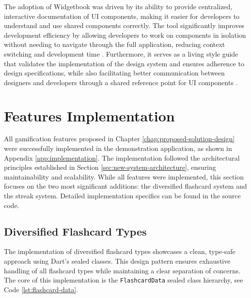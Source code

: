 The adoption of Widgetbook was driven by its ability to provide centralized, interactive documentation of UI components, making it easier for developers to understand and use shared components correctly. The tool significantly improves development efficiency by allowing developers to work on components in isolation without needing to navigate through the full application, reducing context switching and development time \cite{cite:widgetbook_efficiency}. Furthermore, it serves as a living style guide that validates the implementation of the design system and ensures adherence to design specifications, while also facilitating better communication between designers and developers through a shared reference point for UI components \cite{cite:design_system_validation}.

\section{Features Implementation}
\label{sec:features-implementation}

All gamification features proposed in Chapter \ref{chap:proposed-solution-design} were successfully implemented in the demonstration application, as shown in Appendix \ref{app:implementation}. The implementation followed the architectural principles established in Section \ref{sec:new-system-architecture}, ensuring maintainability and scalability. While all features were implemented, this section focuses on the two most significant additions: the diversified flashcard system and the streak system. Detailed implementation specifics can be found in the source code.

\subsection{Diversified Flashcard Types}

The implementation of diversified flashcard types showcases a clean, type-safe approach using Dart's sealed classes. This design pattern ensures exhaustive handling of all flashcard types while maintaining a clear separation of concerns. The core of this implementation is the \texttt{FlashcardData} sealed class hierarchy, see Code \ref{lst:flashcard-data}.

